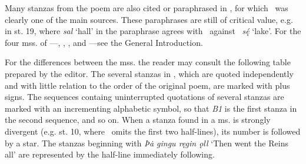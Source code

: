 Many stanzas from the poem are also cited or paraphrased in \Gylfaginning, for which \Voluspa\ was clearly one of the main sources.  These paraphrases are still of critical value, e.g. in st. 19, where \emph{sal} ‘hall’ in the paraphrase agrees with \Hauksbok\ against \Regius\ \emph{sę́} ‘lake’.  For the four mss. of \Gylfaginning—\RegiusProse, \Trajectinus, \Wormianus, and \Upsaliensis—see the General Introduction.

For the differences between the mss. the reader may consult the following table prepared by the editor.  The several stanzas in \Gylfaginning, which are quoted independently and with little relation to the order of the original poem, are marked with plus signs.  The sequences containg uninterrupted quotations of several stanzas are marked with an incrementing alphabetic symbol, so that \emph{B1} is the first stanza in the second sequence, and so on.  When a stanza found in a ms. is strongly divergent (e.g. st. 10, where \Gylfaginning\ omits the first two half-lines), its number is followed by a star.  The stanzas beginning with \emph{Þȧ gingu ręgin ǫll} ‘Then went the Reins all’ are represented by the half-line immediately following.

